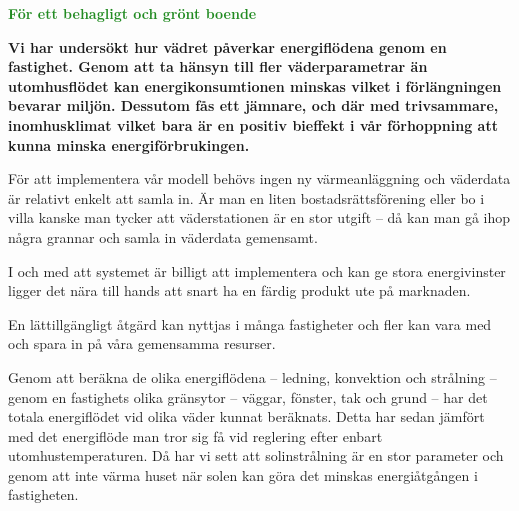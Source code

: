 \documentclass[11pt,a4paper]{article}
\begin{document}
\addtolength{\parindent}{-0.6 cm}
\pagestyle{fancy}
\rhead{\sc\footnotesize \today}
\mbox{}
\vspace{4mm}

\begin{center}
\textcolor{ForestGreen}{\textbf{\Huge För ett behagligt och grönt boende}}
\end{center}

\mbox{}
\vspace{4mm}

\setlength{\columnsep}{5mm}
\begin{multicols}{2}
\addtolength{\parskip}{1.5ex}
\linespread{1.1}
\normalsize

\textbf{Vi har undersökt hur vädret påverkar energiflödena genom en fastighet. Genom att ta hänsyn till fler väderparametrar än utomhusflödet kan energikonsumtionen minskas vilket i förlängningen bevarar miljön. Dessutom fås ett jämnare, och där med trivsammare, inomhusklimat vilket bara är en positiv bieffekt i vår förhoppning att kunna minska energiförbrukingen.}

För att implementera vår modell behövs ingen ny värmeanläggning och väderdata är relativt enkelt att samla in. Är man en liten bostadsrättsförening eller bo i villa kanske man tycker att väderstationen är en stor utgift – då kan man gå ihop några grannar och samla in väderdata gemensamt.  

I och med att systemet är billigt att implementera och kan ge stora energivinster ligger det nära till hands att snart ha en färdig produkt ute på marknaden.

En lättillgängligt åtgärd kan nyttjas i många fastigheter och fler kan vara med och spara in på våra gemensamma resurser.



Genom att beräkna de olika energiflödena – ledning, konvektion och strålning – genom en fastighets olika gränsytor – väggar, fönster, tak och grund – har det totala energiflödet vid olika väder kunnat beräknats. Detta har sedan jämfört med det energiflöde man tror sig få vid reglering efter enbart utomhustemperaturen. Då har vi sett att solinstrålning är en stor parameter och genom att inte värma huset när solen kan göra det minskas energiåtgången i fastigheten.


\end{multicols}
\end{document}
